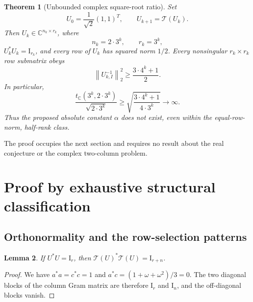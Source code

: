 \documentclass[11pt,letterpaper]{article}
\newtheorem{theorem}{Theorem}[section]
\newtheorem{lemma}[theorem]{Lemma}
\theoremstyle{definition}
\theoremstyle{remark}
\newcommand{\C}{\mathbb C}
\newcommand{\Id}{\mathrm I}
\newcommand{\T}{\mathcal T}
\newcommand{\norm}[1]{\left\lVert#1\right\rVert}
\begin{document}
\begin{theorem}[Unbounded complex square-root ratio]\label{thm:main}
Set
\[
 U_0=\frac1{\sqrt2}(1,1)^T,\qquad U_{k+1}=\T(U_k).
\]
Then $U_k\in\C^{n_k\times r_k}$, where
\[
 n_k=2\cdot3^k,\qquad r_k=3^k,
\]
$U_k^*U_k=\Id_{r_k}$, and every row of $U_k$ has squared norm $1/2$. Every nonsingular $r_k\times r_k$ row submatrix obeys
\begin{equation}
 \norm{U_{k,I}^{-1}}_2^2\ge\frac{3\cdot4^k+1}{2}.
 \label{eq:mainlower}
\end{equation}
In particular,
\begin{equation}
 \frac{t_\C(3^k,2\cdot3^k)}{\sqrt{2\cdot3^k}}
 \ge \sqrt{\frac{3\cdot4^k+1}{4\cdot3^k}}
 \longrightarrow\infty.
 \label{eq:diverge}
\end{equation}
Thus the proposed absolute constant $\alpha$ does not exist, even within the equal-row-norm, half-rank class.
\end{theorem}

The proof occupies the next section and requires no result about the real conjecture or the complex two-column problem.

\section{Proof by exhaustive structural classification}

\subsection{Orthonormality and the row-selection patterns}

\begin{lemma}\label{lem:isometry}
If $U^*U=\Id_r$, then $\T(U)^*\T(U)=\Id_{r+n}$.
\end{lemma}
\begin{proof}
We have $a^*a=c^*c=1$ and $a^*c=(1+\omega+\omega^2)/3=0$. The two diagonal blocks of the column Gram matrix are therefore $\Id_r$ and $\Id_n$, and the off-diagonal blocks vanish.
\end{proof}
\end{document}
